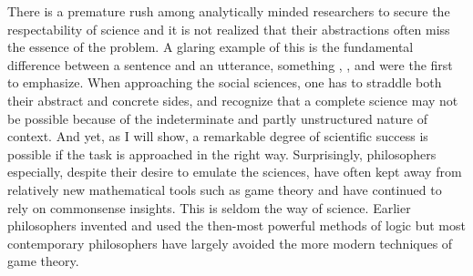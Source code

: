 There is a premature rush among analytically minded researchers to secure the respectability of science and it is not realized that their abstractions often miss the essence of the problem. A glaring example of this is the fundamental difference between a sentence and an utterance, something \citet{wittgenstein:pi}, \citet{austin:pp}, and \citet{strawson:or, strawson:intcon} were the first to emphasize. When approaching the social sciences, one has to straddle both their abstract and concrete sides, and recognize that a complete science may not be possible because of the indeterminate and partly unstructured nature of context. And yet, as I will show, a remarkable degree of scientific success is possible if the task is approached in the right way. Surprisingly, philosophers especially, despite their desire to emulate the sciences, have often kept away from relatively new mathematical tools such as game theory and have continued to rely on commonsense insights. This is seldom the way of science. Earlier philosophers invented and used the then-most powerful methods of logic but most contemporary philosophers have largely avoided the more modern techniques of game theory.

